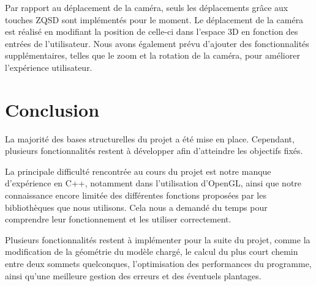 \documentclass[12pt,a4paper]{article}
\begin{document}
Par rapport au déplacement de la caméra, seuls les déplacements grâce aux touches ZQSD sont implémentés pour le moment. Le déplacement de la caméra est réalisé en modifiant la position de celle-ci dans l'espace 3D en fonction des entrées de l'utilisateur. Nous avons également prévu d'ajouter des fonctionnalités supplémentaires, telles que le zoom et la rotation de la caméra, pour améliorer l'expérience utilisateur.

\newpage

\section{Conclusion}

La majorité des bases structurelles du projet a été mise en place. Cependant, plusieurs fonctionnalités restent à développer afin d'atteindre les objectifs fixés. 

La principale difficulté rencontrée au cours du projet est notre manque d'expérience en C++, notamment dans l'utilisation d'OpenGL, ainsi que notre connaissance encore limitée des différentes fonctions proposées par les bibliothèques que nous utilisons. Cela nous a demandé du temps pour comprendre leur fonctionnement et les utiliser correctement. 

Plusieurs fonctionnalités restent à implémenter pour la suite du projet, comme la modification de la géométrie du modèle chargé, le calcul du plus court chemin entre deux sommets quelconques, l'optimisation des performances du programme, ainsi qu'une meilleure gestion des erreurs et des éventuels plantages.
\end{document}
